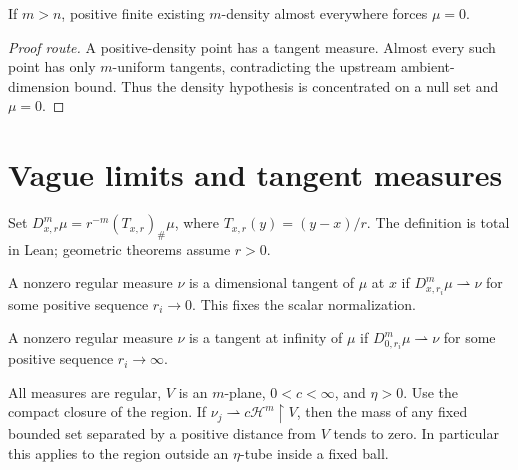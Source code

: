 \begin{lemma}
\label{lem:excess-dimension}
If $m>n$, positive finite existing $m$-density almost everywhere forces $\mu=0$.
\end{lemma}
\begin{proof}[Proof route]
A positive-density point has a tangent measure. Almost every such point has only
$m$-uniform tangents, contradicting the upstream ambient-dimension bound.
Thus the density hypothesis is concentrated on a null set and $\mu=0$.
\end{proof}

\section{Vague limits and tangent measures}

\begin{definition}
\label{def:dimensional-blowup}

Set $D^m_{x,r}\mu=r^{-m}(T_{x,r})_\#\mu$, where $T_{x,r}(y)=(y-x)/r$. The definition is total in Lean; geometric theorems assume $r>0$.
\end{definition}

\begin{definition}
\label{def:dimensional-tangent}

A nonzero regular measure $\nu$ is a dimensional tangent of $\mu$ at $x$ if $D^m_{x,r_i}\mu\rightharpoonup\nu$ for some positive sequence $r_i\to0$. This fixes the scalar normalization.
\end{definition}

\begin{definition}
\label{def:tangent-at-infinity}

A nonzero regular measure $\nu$ is a tangent at infinity of $\mu$ if $D^m_{0,r_i}\mu\rightharpoonup\nu$ for some positive sequence $r_i\to\infty$.
\end{definition}

\begin{lemma}
\label{lem:flat-limit-tube}
All measures are regular, \(V\) is an \(m\)-plane, \(0<c<\infty\), and \(\eta>0\). Use the compact closure of the region.
If \(\nu_j\rightharpoonup c\mathcal H^m\!\restriction V\), then the mass of any fixed bounded set separated by a positive distance from \(V\) tends to zero. In particular this applies to the region outside an \(\eta\)-tube inside a fixed ball.
\end{lemma}


